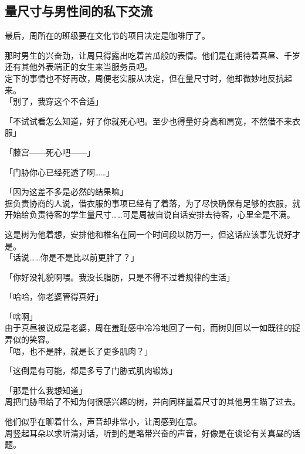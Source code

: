 \subsection{量尺寸与男性间的私下交流}

最后，周所在的班级要在文化节的项目决定是咖啡厅了。

那时男生的兴奋劲，让周只得露出吃着苦瓜般的表情。他们是在期待着真昼、千岁还有其他外表端正的女生来当服务员吧。\\

定下的事情也不好再改，周便老实服从决定，但在量尺寸时，他却微妙地反抗起来。\\

「别了，我穿这个不合适」

「不试试看怎么知道，好了你就死心吧。至少也得量好身高和肩宽，不然借不来衣服」

「藤宫——死心吧——」

「门胁你心已经死透了啊……」

「因为这差不多是必然的结果嘛」\\

据负责协商的人说，借衣服的事项已经有了着落，为了尽快确保有足够的衣服，就开始给负责待客的学生量尺寸……可是周被自说自话安排去待客，心里全是不满。

这是树为他着想，安排他和椎名在同一个时间段以防万一，但这话应该事先说好才是。\\

「话说……你是不是比以前更胖了？」

「你好没礼貌啊喂。我没长脂肪，只是不得不过着规律的生活」

「哈哈，你老婆管得真好」

「啥啊」\\

由于真昼被说成是老婆，周在羞耻感中冷冷地回了一句，而树则回以一如既往的捉弄似的笑容。\\

「唔，也不是胖，就是长了更多肌肉？」

「这倒是有可能，都是多亏了门胁式肌肉锻炼」

「那是什么我想知道」\\

周把门胁甩给了不知为何很感兴趣的树，并向同样量着尺寸的其他男生瞄了过去。

他们似乎在聊着什么，声音却非常小，让周感到在意。\\

周竖起耳朵以求听清对话，听到的是略带兴奋的声音，好像是在谈论有关真昼的话题。\\

